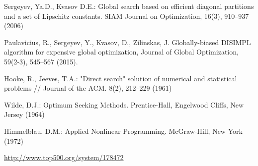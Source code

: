 \documentclass{llncs}
\begin{document}
\begin{thebibliography}{99}
Sergeyev, Ya.D., Kvasov D.E.: Global search based on efficient diagonal partitions and a set of Lipschitz constants. SIAM Journal on Optimization, 16(3), 910--937 (2006)

Paulavicius, R., Sergeyev, Y., Kvasov, D., Zilinskas, J. Globally-biased DISIMPL algorithm for expensive global optimization, Journal of Global Optimization, 59(2-3), 545--567 (2015).

Hooke, R., Jeeves, T.A.: "Direct search" solution of numerical and statistical problems // Journal of the ACM. 8(2), 212--229 (1961)

Wilde, D.J.: Optimum Seeking Methods. Prentice-Hall, Engelwood Cliffs, New Jersey (1964)

Himmelblau, D.M.: Applied Nonlinear Programming. McGraw-Hill, New York (1972)

\url{http://www.top500.org/system/178472}


                                                                           
\end{thebibliography}
\end{document}

